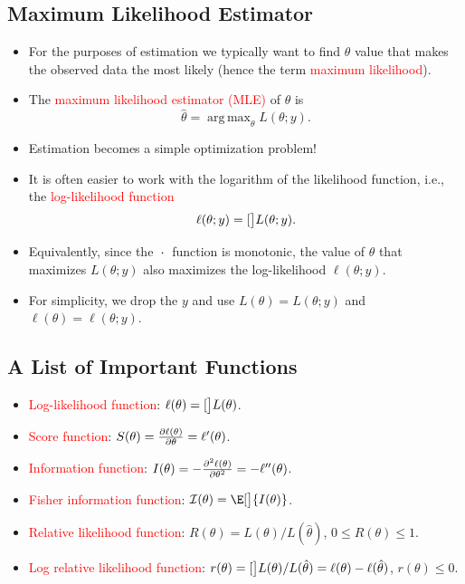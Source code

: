 \documentclass{article}\usepackage[]{graphicx}\usepackage[svgnames]{xcolor}
\let\log\relax%
\DeclareMathOperator*{\argmax}{arg\,max}
\begin{document}
\subsection*{Maximum Likelihood Estimator}
\begin{itemize}
      \item For the purposes of estimation we typically want to find $ \theta $ value that makes the
            observed data the most likely (hence the term \textcolor{Red}{maximum likelihood}).
      \item The \textcolor{Red}{maximum likelihood estimator (MLE)} of $ \theta $ is
            \[ \hat{\theta}=\argmax_\theta L(\theta;y). \]
      \item Estimation becomes a simple optimization problem!
      \item It is often easier to work with the logarithm of the likelihood function, i.e., the
            \textcolor{Red}{log-likelihood function}
            \[ \ell(\theta;y)=\log[\big]{L(\theta;y)}. \]
      \item Equivalently, since the $ \log{\:\cdot\:} $ function is monotonic, the value of $ \theta $ that maximizes $ L(\theta;y) $ also
            maximizes the log-likelihood $ \ell(\theta;y) $.
      \item For simplicity, we drop the $ y $ and use $ L(\theta)=L(\theta;y) $ and $ \ell(\theta)=\ell(\theta;y) $.
\end{itemize}

\subsection*{A List of Important Functions}
\begin{itemize}
      \item \textcolor{Red}{Log-likelihood function}: $ \ell(\theta)=\log[\big]{L(\theta)} $.
      \item \textcolor{Red}{Score function}: $ S(\theta)=\pdv{\ell(\theta)}{\theta}=\ell^\prime(\theta)$.
      \item \textcolor{Red}{Information function}: $ I(\theta)=-\pdv[order=2]{\ell(\theta)}{\theta}=-\ell^{\prime\prime}(\theta) $.
      \item \textcolor{Red}{Fisher information function}: $ \mathcal{I}(\theta)=\E[\big]{I(\theta)} $.
      \item \textcolor{Red}{Relative likelihood function}: $ R(\theta)=L(\theta)/L(\hat{\theta}) $, $ 0\le R(\theta)\le 1 $.
      \item \textcolor{Red}{Log relative likelihood function}: $ r(\theta)=\log[\big]{L(\theta)/L(\hat{\theta})}=\ell(\theta)-\ell(\hat{\theta}) $, $ r(\theta)\le 0 $.
\end{itemize}
\end{document}
